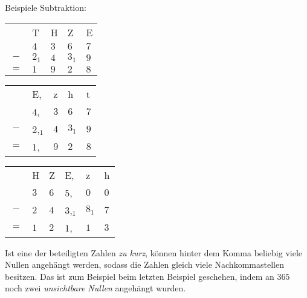 Beispiele Subtraktion:\\
\begin{tabular}{cllll}
	& T     & H   & Z     & E   \\
	& $4$   & $3$ & $6$   & $7$ \\
	$-$ & $2_1$ & $4$ & $3_1$ & $9$ \\ \hline
	$=$ & $1$   & $9$ & $2$   & $8$
\end{tabular}
%
\hfill
%
\begin{tabular}{cllll}
	& E,       & z   & h     & t   \\
	& $4$,     & $3$ & $6$   & $7$ \\
	$-$ & $2$,$_1$ & $4$ & $3_1$ & $9$ \\ \hline
	$=$ & $1$,     & $9$ & $2$   & $8$
\end{tabular}
%
\hfill
%
\begin{tabular}{clllll}
	& H     & Z   & E,       & z     & h   \\
	& $3$   & $6$ & $5$,     & $0$   & $0$ \\
	$-$ & $2$ & $4$ & $3$,$_1$ & $8_1$ & $7$ \\ \hline
	$=$  & $1$   & $2$ & $1$,     & $1$   & $3$
\end{tabular}

Ist eine der beteiligten Zahlen \emph{zu kurz}, können hinter dem Komma beliebig viele Nullen angehängt werden, sodass die Zahlen gleich viele Nachkommastellen besitzen. Das ist zum Beispiel beim letzten Beispiel geschehen, indem an $365$ noch zwei \emph{unsichtbare Nullen} angehängt wurden.
